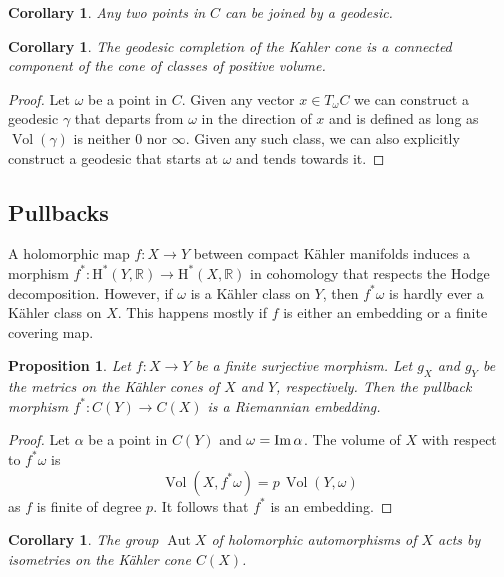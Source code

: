 \documentclass[11pt,a4paper]{amsart}
\newtheorem{prop}[theo]{Proposition}
\newtheorem{coro}[theo]{Corollary}
\theoremstyle{definition}
\theoremstyle{remark}
\newcommand{\RR}{\mathbb{R}}
\newcommand{\Aut}{\mathop{\mathrm{Aut}}}
\newcommand{\Vol}{\mathop{\mathrm{Vol}}}
\def\Im{\mathop{\rm Im}}
\def\coho#1{\mathrm{H}^{#1}}
\def\kf{\omega}
\def\ckf{\alpha}
\def\KC{C}
\begin{document}
\begin{coro}
Any two points in $C$ can be joined by a geodesic. 
\end{coro}



\begin{coro}
The geodesic completion of the Kahler cone is a connected component of
the cone of classes of positive volume.
\end{coro}

\begin{proof}
Let $\kf$ be a point in $C$. Given any vector $x \in T_{\kf}C$ we can
construct a geodesic $\gamma$ that departs from $\kf$ in the direction
of $x$ and is defined as long as $\Vol(\gamma)$ is neither $0$ nor
$\infty$. Given any such class, we can also explicitly construct a
geodesic that starts at $\kf$ and tends towards it.
\end{proof}


\subsection*{Pullbacks}

A holomorphic map $f : X \to Y$ between compact K\"{a}hler manifolds induces
a morphism $f^* : \coho{*}(Y,\RR) \to \coho{*}(X,\RR)$ in cohomology
that respects the Hodge decomposition. However, if $\kf$ is a K\"{a}hler
class on $Y$, then $f^*\kf$ is hardly ever a K\"{a}hler class on $X$. This
happens mostly if $f$ is either an embedding or a finite covering map.

\begin{prop}
Let $f : X \to Y$ be a finite surjective morphism. Let $g_X$ and $g_Y$
be the metrics on the K\"{a}hler cones of $X$ and $Y$, respectively.
Then the pullback morphism $f^* : \KC(Y) \to \KC(X)$ is a Riemannian
embedding.
\end{prop}

\begin{proof}
Let $\ckf$ be a point in $\KC(Y)$ and $\kf = \Im \ckf$. The volume of
$X$ with respect to $f^*\kf$ is
\begin{equation*}
  \Vol(X,f^*\kf) = p \, \Vol(Y,\kf)
\end{equation*}
as $f$ is finite of degree $p$. It follows that $f^*$ is an embedding.
\end{proof}

\begin{coro}
The group $\Aut X$ of holomorphic automorphisms of $X$ acts by
isometries on the K\"{a}hler cone $\KC(X)$.
\end{coro}
\end{document}
